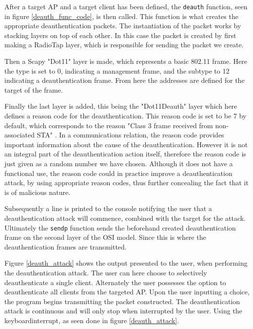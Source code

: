 After a target AP and a target client has been defined, the \lstinline{deauth} function, seen in figure \ref{deauth_func_code}, is then called. This function is what creates the appropriate deauthentication packets. The instantiation of the packet works by stacking layers on top of each other. In this case the packet is created by first making a RadioTap layer, which is responsible for sending the packet we create.

Then a Scapy "Dot11" layer is made, which represents a basic 802.11 frame. Here the type is set to 0, indicating a management frame, and the subtype to 12 indicating a deauthentication frame. From here the addresses are defined for the target of the frame. 

Finally the last layer is added, this being the "Dot11Deauth" layer which here defines a reason code for the deauthentication. This reason code is set to be 7 by default, which corresponds to the reason "Class 3 frame received from non-associated STA" \cite{Cisco_Deathentication_reasoncodes}. In a communications relation, the reason code provides important information about the cause of the deauthentication. However it is not an integral part of the deauthentication action itself, therefore the reason code is just given as a random number we have chosen.
Although it does not have a functional use, the reason code could in practice improve a deauthentication attack, by using appropriate reason codes, thus further concealing the fact that it is of malicious nature.

Subsequently a line is printed to the console notifying the user that a deauthentication attack will commence, combined with the target for the attack.
Ultimately the \lstinline{sendp} function sends the beforehand created deauthentication frame on the second layer of the OSI model. Since this is where the deauthentication frames are transmitted\cite{data-link-layer}.


Figure \ref{deauth_attack} shows the output presented to the user, when performing the deauthentication attack. The user can here choose to selectively deauthenticate a single client. Alternately the user possesses the option to deauthenticate all clients from the targeted AP. Upon the user inputting a choice, the program begins transmitting the packet constructed. The deauthentication attack is continuous and will only stop when interrupted by the user. Using the keyboardinterrupt, as seen done in figure \ref{deauth_attack}. 

